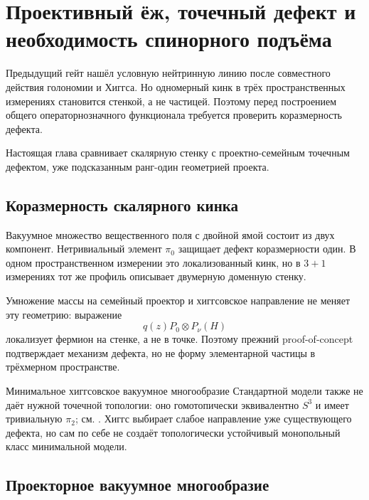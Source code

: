\chapter{Проективный ёж, точечный дефект и необходимость спинорного подъёма}

Предыдущий гейт нашёл условную нейтринную линию после совместного действия
голономии и Хиггса. Но одномерный кинк в трёх пространственных измерениях
становится стенкой, а не частицей. Поэтому перед построением общего
операторнозначного функционала требуется проверить коразмерность дефекта.

Настоящая глава сравнивает скалярную стенку с проектно-семейным точечным
дефектом, уже подсказанным ранг-один геометрией проекта.

\section{Коразмерность скалярного кинка}

Вакуумное множество вещественного поля с двойной ямой состоит из двух
компонент. Нетривиальный элемент $\pi_0$ защищает дефект коразмерности
один. В одном пространственном измерении это локализованный кинк, но в
$3+1$ измерениях тот же профиль описывает двумерную доменную стенку.

Умножение массы на семейный проектор и хиггсовское направление не меняет
эту геометрию: выражение
\begin{equation}
 q(z)P_0\otimes P_\nu(H)
\end{equation}
локализует фермион на стенке, а не в точке. Поэтому прежний
proof-of-concept подтверждает механизм дефекта, но не форму элементарной
частицы в трёхмерном пространстве.

Минимальное хиггсовское вакуумное многообразие Стандартной модели также не
даёт нужной точечной топологии: оно гомотопически эквивалентно $S^3$ и
имеет тривиальную $\pi_2$; см. . Хиггс выбирает
слабое направление уже существующего дефекта, но сам по себе не создаёт
топологически устойчивый монопольный класс минимальной модели.

\section{Проекторное вакуумное многообразие}

